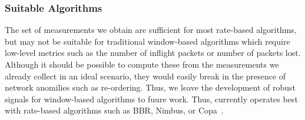 
\label{s:measure:limitation:reorder}




\subsubsection{Suitable Algorithms}
\label{s:measure:limitation:algs}
The set of measurements we obtain are sufficient for most rate-based algorithms, but may not be 
suitable for traditional window-based algorithms which require low-level metrics such as 
the number of inflight packets or number of packets lost. Although it should be possible
to compute these from the measurements we already collect in an ideal scenario, they would easily
break in the presence of network anomilies such as re-ordering. Thus, we leave the development
of robust signals for window-based algorithms to fuure work. 
Thus, \name currently operates best with rate-based algorithms such as BBR, Nimbus, or Copa~\cite{bbr,nimbus,copa}.

